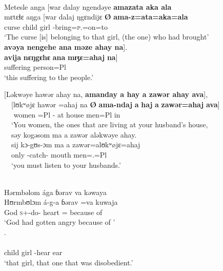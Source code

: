 \ea \label{ex:5:99}\\
Metesle  anga [war  dalay  ngendəye  \textbf{amazata  aka  ala}  \\
\gll mɛtɛɬɛ aŋga [war dalaj ŋgɛndijɛ \textbf{Ø} \textbf{ama-z=ata}\textbf{=aka}\textbf{=ala} \\
curse  {\POSS}  child  girl  {\DEM}  { }    {\DEP}-bring=\textsc{p}.{\IO}=on=to\\
\glt ‘The curse [is] belonging to that girl, (the one) who had brought’\\

\clearpage
\medskip
\textbf{avəya  nengehe  ana  məze  ahay  na}].\\
\gll \textbf{avija} \textbf{nɛŋgɛhɛ} \textbf{ana} \textbf{mɪʒɛ}\textbf{=ahaj} \textbf{na}]\\
suffering    {\DEM}    {\DAT}    person=Pl          {\PSP}\\
\glt ‘this suffering to the people.’
\z

\ea \label{ex:5:100}
{}[Ləkwəye  hawər  ahay  na, \textbf{amanday  a  hay  a  zawər  ahay  ava}], \\
\gll  \ \ {}[lʊkʷøjɛ  hawər  =ahaj   na  \textbf{Ø}    \textbf{ama-ndaj} \textbf{a} \textbf{haj} \textbf{a} \textbf{zawər}\textbf{=ahaj} \textbf{ava}]\\
     \ \ {\twoP}    women  =Pl  {\PSP}    { }      {\DEP}-{\PROG}  at  house  {\GEN}  men=Pl  in\\
\glt  \ \ ‘You women, the ones that are living at your husband’s house,\\
\medskip
 \ \ səy  kogəsom  ma  a  zawər  aləkwəye  ahay.\\
\gll \ \ sij kɔ-gʊs-ɔm ma a zawər=alʊkʷøjɛ=ahaj\\
\ \ only    -catch-{\twoP}  mouth  {\GEN}  men={\twoP}.{\POSS}=Pl  \\
\glt \ \ ‘you must listen to your husbands.’
\z

\ea \label{ex:5:101}\\
Hərmbəlom  ága  ɓərav  va  kəwaya  \\
\gll  Hʊrmbʊlɔm  á-g-a         ɓərav   =va  kuwaja     \\
      God \textsc{s}+{\IFV}-do-{\CL}  heart   ={\PRF}  {because of}   \\
\glt ‘God had gotten angry because of ’\\

.  \\
\\
      child   girl      {\PSP} { } {\DEP}-hear   ear       {\NEG}     {\DEM}\\
\glt  ‘that girl, that one that was disobedient.’\\
\z

